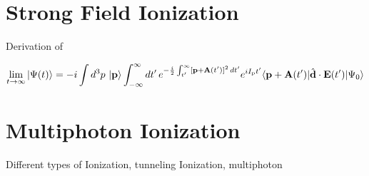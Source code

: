 \newpage
\section{Strong Field Ionization}

Derivation of 

\begin{equation}
    \lim_{t \to \infty} \ket{\Psi(t)}  = -i \int d^3 p\, \ket{\mathbf{p}} \int_{-\infty}^{\infty} dt'\, e^{-\frac{i}{2}\int_{t'}^{\infty} [\mathbf{p}+\mathbf{A}(t')]^2 \, dt'} e^{i I_\mathrm{p} t'} \langle \mathbf{p} + \mathbf{A}(t') | \hat{\mathbf{d}} \cdot \mathbf{E}(t') | \Psi_0 \rangle
\end{equation}



\newpage
\section{Multiphoton Ionization}

Different types of Ionization, tunneling Ionization, multiphoton